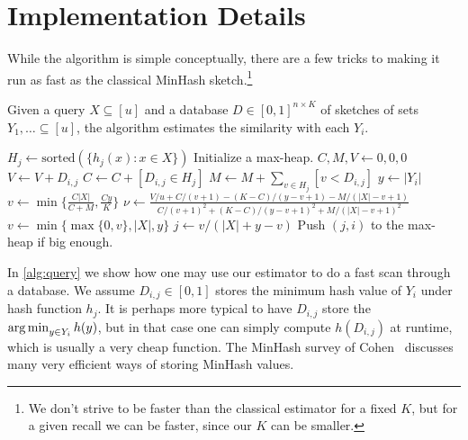 
\section{Implementation Details}

While the algorithm is simple conceptually, there are a few tricks to making it run as fast as the classical MinHash sketch.\footnote{We don't strive to be faster than the classical estimator for a fixed $K$, but for a given recall we can be faster, since our $K$ can be smaller.}

\begin{algorithm}[H]
   \caption{Given a query $X\subseteq [u]$ and a database $D\in [0,1]^{n\times K}$ of sketches of sets $Y_1,\dots\subseteq [u]$, the algorithm estimates the similarity with each $Y_i$.}
   \label{alg:query}
   \begin{algorithmic}[1]
         \State $H_j \gets \text{sorted}(\{h_j(x) : x \in X\})$
      \EndFor
      \State Initialize a max-heap.
         \State $C, M, V \gets 0, 0, 0$
         \State $V \gets V + D_{i,j}$
            \State $C\gets C + [D_{i,j} \in H_j]$ \label{line:contains}
            \State $M \gets M + \sum_{v\in H_j} [v < D_{i,j}]$ \label{line:prefix}
         \EndFor
         \State $y \gets |Y_i|$
         \State $v \gets \min\{\frac{C|X|}{C+M},\frac{Cy}{K}\}$
            \State $\nu \gets \frac{V/u + C/(v+1) - (K-C)/(y-v+1) - M/(|X|-v+1)}
            {C/(v+1)^2 + (K-C)/(y-v+1)^2 + M/(|X|-v+1)^2}$
            \State $v \gets \min\{\max\{0,v\}, |X|, y\}$
         \EndFor
         \State $j \gets v/(|X| + y - v)$ 
         \State Push $(j,i)$ to the max-heap if big enough.
      \EndFor
   \end{algorithmic}
\end{algorithm}

In \cref{alg:query} we show how one may use our estimator to do a fast scan through a database.
We assume $D_{i,j}\in[0,1]$ stores the minimum hash value of $Y_i$ under hash function $h_j$.
It is perhaps more typical to have $D_{i,j}$ store the $\operatorname*{arg\,min}_{y\in Y_i}h(y)$, but in that case one can simply compute $h(D_{i,j})$ at runtime, which is usually a very cheap function.
The MinHash survey of Cohen~\cite{DBLP:reference/algo/Cohen16b} discusses many very efficient ways of storing MinHash values.


